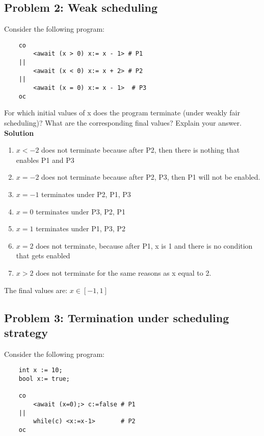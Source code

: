 \subsection{Problem 2: Weak scheduling}

Consider the following program:

\begin{lstlisting}
    co
        <await (x > 0) x:= x - 1> # P1
    ||
        <await (x < 0) x:= x + 2> # P2
    ||
        <await (x = 0) x:= x - 1>  # P3
    oc
\end{lstlisting}


For which initial values of x does the program terminate (under weakly fair scheduling)?
What are the corresponding final values? Explain your answer. \\

\textbf{Solution}

\begin{enumerate}
    \item $x<-2$ does not terminate because after P2, then there is nothing that enables P1 and P3
    \item $x=-2$ does not terminate because after P2, P3, then P1 will not be enabled.
    \item $x=-1$ terminates under P2, P1, P3
    \item $x=0$ terminates under P3, P2, P1
    \item $x=1$ terminates under P1, P3, P2
    \item $x=2$ does not terminate, because after P1, x is 1 and there is no condition that gets enabled
    \item $x>2$ does not terminate for the same reasons as x equal to 2.
\end{enumerate}

The final values are: $x\in [-1,1]$



\subsection{Problem 3: Termination under scheduling strategy}

Consider the following program:

\begin{lstlisting}
    int x := 10;
    bool x:= true;

    co 
        <await (x=0);> c:=false # P1
    ||
        while(c) <x:=x-1>       # P2
    oc
\end{lstlisting}



